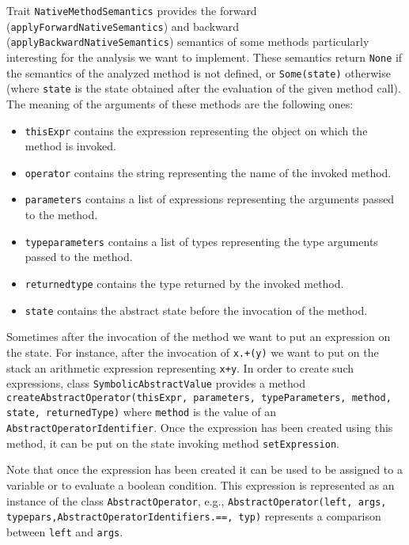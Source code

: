 \documentclass[11pt]{article}
\newcommand{\statement}[1]{\lstinline{#1}}
\begin{document}
Trait \statement{NativeMethodSemantics} provides the forward (\statement{applyForwardNativeSemantics}) and backward (\statement{applyBackwardNativeSemantics}) semantics of some methods particularly interesting for the analysis we want to implement. These semantics return \statement{None} if the semantics of the analyzed method is not defined, or \statement{Some(state)} otherwise (where \statement{state} is the state obtained after the evaluation of the given method call). The meaning of the arguments of these methods are the following ones:
\begin{itemize}
\item \statement{thisExpr} contains the expression representing the object on which the method is invoked.
\item \statement{operator} contains the string representing the name of the invoked method.
\item \statement{parameters} contains a list of expressions representing the arguments passed to the method.
\item \statement{typeparameters} contains a list of types representing the type arguments passed to the method.
\item \statement{returnedtype} contains the type returned by the invoked method.
\item \statement{state} contains the abstract state before the invocation of the method.
\end{itemize}

Sometimes after the invocation of the method we want to put an expression on the state. For instance, after the invocation of \statement{x.+(y)} we want to put on the stack an arithmetic expression representing \statement{x+y}. In order to create such expressions, class \statement{SymbolicAbstractValue} provides a method \statement{createAbstractOperator(thisExpr, parameters, typeParameters, method, state, returnedType)} where \statement{method} is the value of an \statement{AbstractOperatorIdentifier}. Once the expression has been created using this method, it can be put on the state invoking method \statement{setExpression}.

Note that once the expression has been created it can be used to be assigned to a variable or to evaluate a boolean condition. This expression is represented as an instance of the class \statement{AbstractOperator}, e.g., \statement{AbstractOperator(left, args, typepars,AbstractOperatorIdentifiers.==, typ)} represents a comparison between \statement{left} and \statement{args}.
\end{document}
